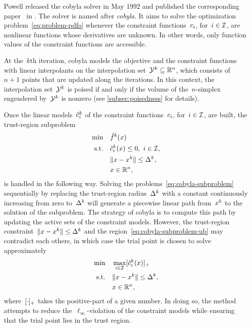 Powell released the \gls{cobyla} solver in May 1992 and published the corresponding paper~\cite{Powell_1994} in .
The solver is named after \emph{\glsdesc{cobyla}}.
It aims to solve the optimization problem~\cref{eq:problem-pdfo} whenever the constraint functions~$c_{i}$, for~$i \in \mathcal{I}$, are nonlinear functions whose derivatives are unknown.
In other words, only function values of the constraint functions are accessible.

At the~$k$th iteration, \gls{cobyla} models the objective and the constraint functions with linear interpolants on the interpolation set~$\xpt[k] \subseteq \R^n$, which consists of~$n + 1$ points that are updated along the iterations.
In this context, the interpolation set~$\xpt[k]$ is poised if and only if the volume of the~$n$-simplex engendered by~$\xpt[k]$ is nonzero (see \cref{subsec:poisedness} for details).

Once the linear models~$\conm[k]{i}$ of the constraint functions~$c_{i}$, for~$i \in \mathcal{I}$, are built, the trust-region subproblem
\begin{subequations}
    \label{eq:cobyla-subproblem}
    \begin{align}
        \min        & \quad \objm[k](\iter)\\
        \text{s.t.} & \quad \conm[k]{i}(\iter) \le 0, ~ i \in \iub, \label{eq:cobyla-subproblem-ub}\\
                    & \quad \norm{\iter - \iter[k]} \le \rad[k],\\
                    & \quad \iter \in \R^n, \nonumber
    \end{align}
\end{subequations}
is handled in the following way.
Solving the problems~\cref{eq:cobyla-subproblem} sequentially by replacing the trust-region radius~$\rad[k]$ with a constant continuously increasing from zero to~$\rad[k]$ will generate a piecewise linear path from~$\iter[k]$ to the solution of the subproblem.
The strategy of \gls{cobyla} is to compute this path by updating the active sets of the constraint models.
However, the trust-region constraint~$\norm{\iter - \iter[k]} \le \rad[k]$ and the region~\cref{eq:cobyla-subproblem-ub} may contradict each others, in which case the trial point is chosen to solve approximately
\begin{align*}
    \min        & \quad \max_{i \in \iub} \posp{\conm[k]{i}(\iter)}\\
    \text{s.t.} & \quad \norm{\iter - \iter[k]} \le \rad[k],\\
                & \quad \iter \in \R^n,
\end{align*}
%
where~$[\cdot]_+$ takes the positive-part of a given number.
In doing so, the method attempts to reduce the~$\ell_{\infty}$-violation of the constraint models while ensuring that the trial point lies in the trust region.

